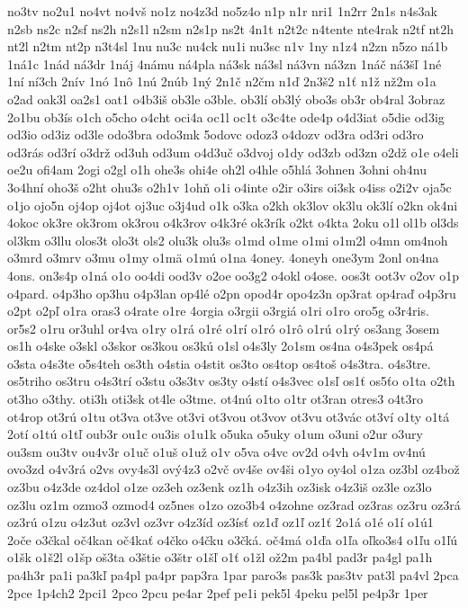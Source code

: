 {no3tv
no2u1
no4vt
no4vš
no1z
no4z3d
no5z4o
n1p
n1r
nri1
1n2rr
2n1s
n4s3ak
n2sb
ns2c
n2sf
ns2h
n2s1l
n2sm
n2s1p
ns2t
4n1t
n2t2c
n4tente
nte4rak
n2tf
nt2h
nt2l
n2tm
nt2p
n3t4sl
1nu
nu3c
nu4ck
nu1i
nu3sc
n1v
1ny
n1z4
n2zn
n5zo
ná1b
1ná1c
1nád
ná3dr
1náj
4námu
ná4pla
ná3sk
ná3sl
ná3vn
ná3zn
1náč
ná3šľ
1né
1ní
ní3ch
2nív
1nó
1nô
1nú
2núb
1ný
2n1č
n2čm
n1ď
2n3š2
n1ť
n1ž
nž2m
o1a
o2ad
oak3l
oa2s1
oat1
o4b3iš
ob3le
o3ble.
ob3lí
ob3lý
obo3s
ob3r
ob4ral
3obraz
2o1bu
ob3ís
o1ch
o5cho
o4cht
oci4a
oc1l
oc1t
o3c4te
ode4p
o4d3iat
o5die
od3ig
od3io
od3iz
od3le
odo3bra
odo3mk
5odovc
odoz3
o4dozv
od3ra
od3ri
od3ro
od3rás
od3rí
o3drž
od3uh
od3um
o4d3uč
o3dvoj
o1dy
od3zb
od3zn
o2dž
o1e
o4eli
oe2u
ofi4am
2ogi
o2gl
o1h
ohe3s
ohi4e
oh2l
o4hle
o5hlá
3ohnen
3ohni
oh4nu
3o4hní
oho3š
o2ht
ohu3s
o2h1v
1ohň
o1i
o4inte
o2ir
o3irs
oi3sk
o4iss
o2i2v
oja5c
o1jo
ojo5n
oj4op
oj4ot
oj3uc
o3j4ud
o1k
o3ka
o2kh
ok3lov
ok3lu
ok3lí
o2kn
ok4ni
4okoc
ok3re
ok3rom
ok3rou
o4k3rov
o4k3ré
ok3rík
o2kt
o4kta
2oku
o1l
ol1b
ol3ds
ol3km
o3llu
olos3t
olo3t
ols2
olu3k
olu3s
o1md
o1me
o1mi
o1m2l
o4mn
om4noh
o3mrd
o3mrv
o3mu
o1my
o1mä
o1mú
o1na
4oney.
4oneyh
one3ym
2onl
on4na
4ons.
on3s4p
o1ná
o1o
oo4di
ood3v
o2oe
oo3g2
o4okl
o4ose.
oos3t
oot3v
o2ov
o1p
o4pard.
o4p3ho
op3hu
o4p3lan
op4lé
o2pn
opod4r
opo4z3n
op3rat
op4raď
o4p3ru
o2pt
o2pľ
o1ra
oras3
o4rate
o1re
4orgia
o3rgii
o3rgiá
o1ri
o1ro
oro5g
o3r4ris.
or5s2
o1ru
or3uhl
or4va
o1ry
o1rá
o1ré
o1rí
o1ró
o1rô
o1rú
o1rý
os3ang
3osem
os1h
o4ske
o3skl
o3skor
os3kou
os3kú
o1sl
o4s3ly
2o1sm
os4na
o4s3pek
os4pá
o3sta
o4s3te
o5s4teh
os3th
o4stia
o4stit
os3to
os4top
os4toš
o4s3tra.
o4s3tre.
os5triho
os3tru
o4s3trí
o3stu
o3s3tv
os3ty
o4stí
o4s3vec
o1sľ
os1ť
os5ťo
o1ta
o2th
ot3ho
o3thy.
oti3h
oti3sk
ot4le
o3tme.
ot4nú
o1to
o1tr
ot3ran
otres3
o4t3ro
ot4rop
ot3rú
o1tu
ot3va
ot3ve
ot3vi
ot3vou
ot3vov
ot3vu
ot3vác
ot3ví
o1ty
o1tá
2otí
o1tú
o1tľ
oub3r
ou1c
ou3is
o1u1k
o5uka
o5uky
o1um
o3uni
o2ur
o3ury
ou3sm
ou3tv
ou4v3r
o1uč
o1uš
o1už
o1v
o5va
o4vc
ov2d
o4vh
o4v1m
ov4nú
ovo3zd
o4v3rá
o2vs
ovy4s3l
ový4z3
o2vč
ov4še
ov4ši
o1yo
oy4ol
o1za
oz3bl
oz4bož
oz3bu
o4z3de
oz4dol
o1ze
oz3eh
oz3enk
oz1h
o4z3ih
oz3isk
o4z3iš
oz3le
oz3lo
oz3lu
oz1m
ozmo3
ozmod4
oz5nes
o1zo
ozo3b4
o4zohne
oz3rad
oz3ras
oz3ru
oz3rá
oz3rú
o1zu
o4z3ut
oz3vl
oz3vr
o4z3íd
oz3ísť
oz1ď
oz1ľ
oz1ť
2o1á
o1é
o1í
o1ú1
2oče
o3čkal
oč4kan
oč4kať
o4čko
o4čku
o3čká.
oč4má
o1ďa
o1ľa
oľko3s4
o1ľu
o1ľú
o1šk
o1š2l
o1šp
oš3ta
o3štie
o3štr
o1šľ
o1ť
o1žl
ož2m
pa4bl
pad3r
pa4gl
pa1h
pa4h3r
pa1i
pa3kľ
pa4pl
pa4pr
pap3ra
1par
paro3s
pas3k
pas3tv
pat3l
pa4vl
2pca
2pce
1p4ch2
2pci1
2pco
2pcu
pe4ar
2pef
pe1i
pek5l
4peku
pel5l
pe4p3r
1per
}
